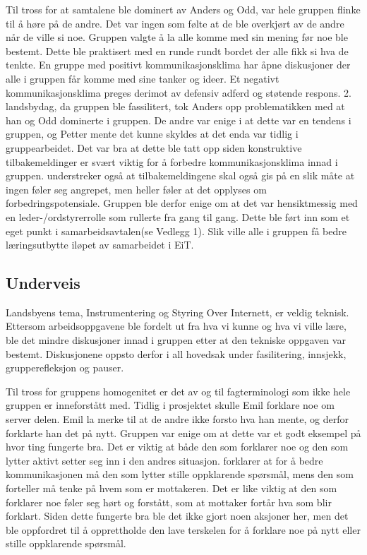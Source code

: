 Til tross for at samtalene ble dominert av Anders og Odd, var hele gruppen flinke til å høre på de andre. 
Det var ingen som følte at de ble overkjørt av de andre når de ville si noe. 
Gruppen valgte å la alle komme med sin mening før noe ble bestemt. 
Dette ble praktisert med en runde rundt bordet der alle fikk si hva de tenkte. 
En gruppe med positivt kommunikasjonsklima har åpne diskusjoner der alle i gruppen får komme med sine tanker og ideer\citep{levin}. 
Et negativt kommunikasjonsklima preges derimot av defensiv adferd og støtende respons. 
2. landsbydag, da gruppen ble fassilitert, tok Anders opp problematikken med at han og Odd dominerte i gruppen. 
De andre var enige i at dette var en tendens i gruppen, og Petter mente det kunne skyldes at det enda var tidlig i gruppearbeidet. 
Det var bra at dette ble tatt opp siden konstruktive tilbakemeldinger er svært viktig for å forbedre kommunikasjonsklima innad i gruppen.
\citet{levin} understreker også at tilbakemeldingene skal også gis på en slik måte at ingen føler seg angrepet, men heller føler at det opplyses om forbedringspotensiale.
Gruppen ble derfor enige om at det var hensiktmessig med en leder-/ordstyrerrolle som rullerte fra gang til gang.
Dette ble ført inn som et eget punkt i samarbeidsavtalen(se Vedlegg 1). 
Slik ville alle i gruppen få bedre læringsutbytte iløpet av samarbeidet i EiT. 
\vspace{\secspace}

\subsection{Underveis}
Landsbyens tema, Instrumentering og Styring Over Internett, er veldig teknisk. 
Ettersom arbeidsoppgavene ble fordelt ut fra hva vi kunne og hva vi ville lære, ble det mindre diskusjoner innad i gruppen etter at den tekniske oppgaven var bestemt. 
Diskusjonene oppsto derfor i all hovedsak under fasilitering, innsjekk, grupperefleksjon og pauser. 
\vspace{\secspace}

Til tross for gruppens homogenitet er det av og til fagterminologi som ikke hele gruppen er inneforstått med.  
Tidlig i prosjektet skulle Emil forklare noe om server delen. 
Emil la merke til at de andre ikke forsto hva han mente, og derfor forklarte han det på nytt. 
Gruppen var enige om at dette var et godt eksempel på hvor ting fungerte bra. 
Det er viktig at både den som forklarer noe og den som lytter aktivt setter seg inn i den andres situasjon.
\citet{levin} forklarer at for å bedre kommunikasjonen må den som lytter stille oppklarende spørsmål, mens den som forteller må tenke på hvem som er mottakeren. 
Det er like viktig at den som forklarer noe føler seg hørt og forstått, som at mottaker fortår hva som blir forklart. 
Siden dette fungerte bra ble det ikke gjort noen aksjoner her, men det ble oppfordret til å opprettholde den lave terskelen for å forklare noe på nytt eller stille oppklarende spørsmål.
\vspace{\secspace}

